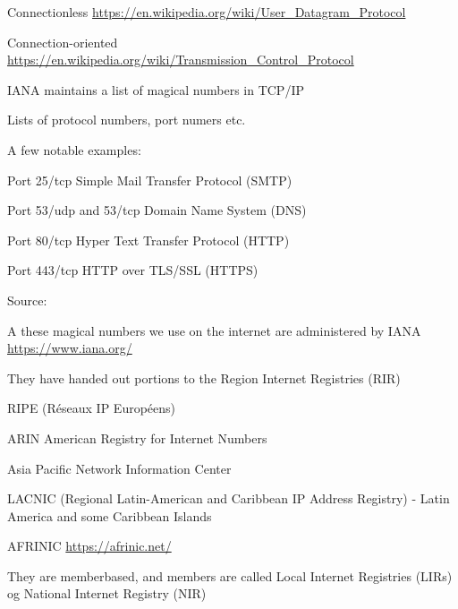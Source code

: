 \documentclass[Screen16to9,17pt]{foils}
\begin{document}
Connectionless \url{https://en.wikipedia.org/wiki/User_Datagram_Protocol}



Connection-oriented \url{https://en.wikipedia.org/wiki/Transmission_Control_Protocol}




\begin{list1}
\item IANA maintains a list of magical numbers in TCP/IP
\item Lists of protocol numbers, port numers etc.
\item A few notable examples:
\begin{list2}
\item Port 25/tcp Simple Mail Transfer Protocol (SMTP)
\item Port 53/udp and 53/tcp Domain Name System (DNS)
\item Port 80/tcp Hyper Text Transfer Protocol (HTTP)
\item Port 443/tcp HTTP over TLS/SSL (HTTPS)
\end{list2}
\item Source: 
\end{list1}



\begin{list1}
\item A these magical numbers we use on the internet are administered by IANA \url{https://www.iana.org/}
\item They have handed out portions to the Region Internet Registries (RIR)
\begin{list2}
\item RIPE (Réseaux IP Européens)  
\item ARIN American Registry for Internet Numbers 
\item Asia Pacific Network Information Center 
\item LACNIC (Regional Latin-American and Caribbean IP Address Registry) - Latin America and some Caribbean Islands
\item AFRINIC \url{https://afrinic.net/}
\end{list2}
\item They are memberbased, and members are called Local Internet Registries (LIRs) og National Internet Registry (NIR)
\end{list1}
\end{document}
